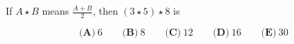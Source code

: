 

If $ A \star B$ means $ \frac{A+B}{2}$, then $ (3 \star 5) \star 8$ is

\[ \textbf{(A)}\ 6 \qquad
\textbf{(B)}\ 8 \qquad
\textbf{(C)}\ 12 \qquad
\textbf{(D)}\ 16 \qquad
\textbf{(E)}\ 30
\]